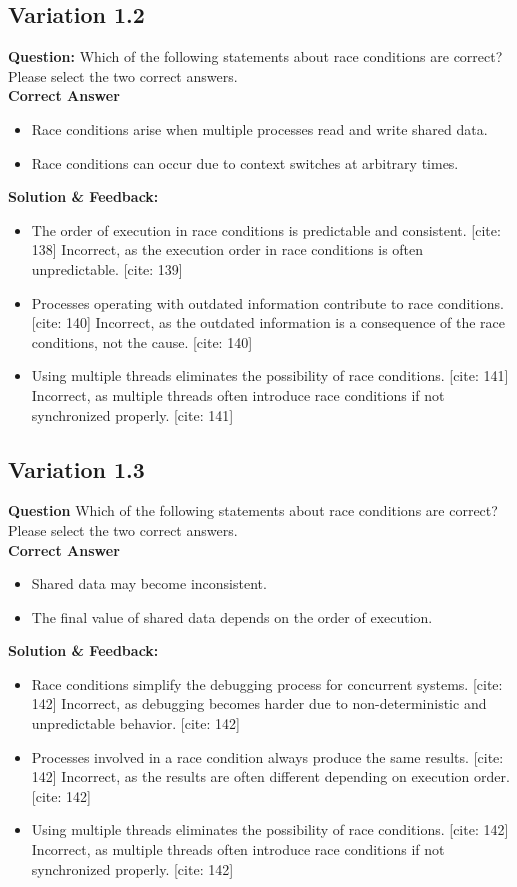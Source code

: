 \subsection{Variation 1.2}
\textbf{Question:} Which of the following statements about race conditions are correct? Please select the two correct answers. \\
\textbf{Correct Answer}
\begin{itemize}
    \item Race conditions arise when multiple processes read and write shared data. 
    \item Race conditions can occur due to context switches at arbitrary times. 
\end{itemize}
\textbf{Solution \& Feedback:}
\begin{itemize}
    \item The order of execution in race conditions is predictable and consistent. [cite: 138] Incorrect, as the execution order in race conditions is often unpredictable. [cite: 139]
    \item Processes operating with outdated information contribute to race conditions. [cite: 140] Incorrect, as the outdated information is a consequence of the race conditions, not the cause. [cite: 140]
    \item Using multiple threads eliminates the possibility of race conditions. [cite: 141] Incorrect, as multiple threads often introduce race conditions if not synchronized properly. [cite: 141]
\end{itemize}

\subsection{Variation 1.3}
\textbf{Question} Which of the following statements about race conditions are correct? Please select the two correct answers. \\
\textbf{Correct Answer}
\begin{itemize} 
    \item Shared data may become inconsistent. 
    \item The final value of shared data depends on the order of execution.
\end{itemize}
\textbf{Solution \& Feedback:}
\begin{itemize}
    \item Race conditions simplify the debugging process for concurrent systems. [cite: 142] Incorrect, as debugging becomes harder due to non-deterministic and unpredictable behavior. [cite: 142]
    \item Processes involved in a race condition always produce the same results. [cite: 142] Incorrect, as the results are often different depending on execution order. [cite: 142]
    \item Using multiple threads eliminates the possibility of race conditions. [cite: 142] Incorrect, as multiple threads often introduce race conditions if not synchronized properly. [cite: 142]
\end{itemize}

